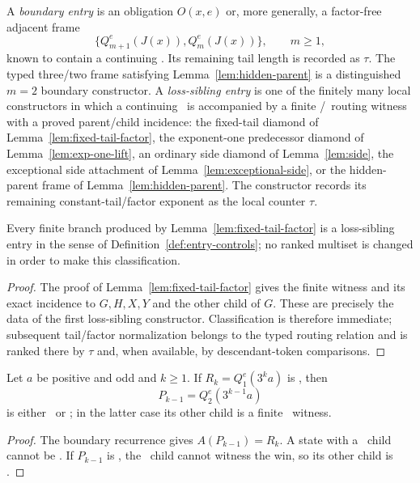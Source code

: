 \begin{definition}\label{def:entry-controls}
A \emph{boundary entry} is an obligation $O(x,e)$ or, more generally, a
factor-free adjacent frame
\[
 \{Q_{m+1}^e(J(x)),Q_m^e(J(x))\},\qquad m\ge1,
\]
known to contain a continuing \DRAW. Its remaining tail length is recorded as
$\tau$. The typed three/two frame satisfying Lemma~\ref{lem:hidden-parent} is
a distinguished $m=2$ boundary constructor.
A \emph{loss-sibling entry} is one of the finitely many local constructors
in which a continuing \DRAW\ is accompanied by a finite \WIN/\LOSS\ routing
witness with a proved parent/child incidence: the fixed-tail diamond of Lemma~\ref{lem:fixed-tail-factor}, the exponent-one predecessor diamond of Lemma~\ref{lem:exp-one-lift}, an ordinary side diamond of Lemma~\ref{lem:side}, the exceptional side attachment of Lemma~\ref{lem:exceptional-side}, or the hidden-parent frame of Lemma~\ref{lem:hidden-parent}. The constructor records its remaining
constant-tail/factor exponent as the local counter $\tau$.
\end{definition}

\begin{lemma}\label{lem:entry-typing}
Every finite branch produced by Lemma~\ref{lem:fixed-tail-factor} is a
loss-sibling entry in the sense of Definition~\ref{def:entry-controls}; no
ranked multiset is changed in order to make this classification.
\end{lemma}

\begin{proof}
The proof of Lemma~\ref{lem:fixed-tail-factor} gives the finite witness and
its exact incidence to $G,H,X,Y$ and the other child of $G$. These are
precisely the data of the first loss-sibling constructor. Classification is
therefore immediate; subsequent tail/factor normalization belongs to the
typed routing relation and is ranked there by $\tau$ and, when available,
by descendant-token comparisons.
\end{proof}

\begin{lemma}\label{lem:exp-one-lift}
Let $a$ be positive and odd and $k\ge1$. If
$R_k=Q_1^e(3^ka)$ is \DRAW, then
\[
  P_{k-1}=Q_2^e(3^{k-1}a)
\]
is either \DRAW\ or \WIN; in the latter case its other child is a finite
\LOSS\ witness.
\end{lemma}

\begin{proof}
The boundary recurrence gives $A(P_{k-1})=R_k$. A state with a \DRAW\ child
cannot be \LOSS. If $P_{k-1}$ is \WIN, the \DRAW\ child cannot witness the
win, so its other child is \LOSS.
\end{proof}

